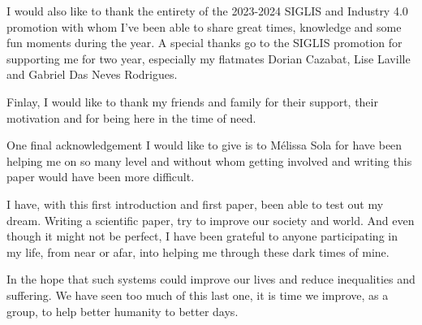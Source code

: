\documentclass[conference]{IEEEtran}
\begin{document}
I would also like to thank the entirety of the 2023-2024 SIGLIS and Industry 4.0 promotion with whom I've been able to share great times, knowledge and some fun moments during the year. A special thanks go to the SIGLIS promotion for supporting me for two year, especially my flatmates Dorian Cazabat, Lise Laville and Gabriel Das Neves Rodrigues. 

Finlay, I would like to thank my friends and family for their support, their motivation and for being here in the time of need.

One final acknowledgement I would like to give is to Mélissa Sola for have been helping me on so many level and without whom getting involved and writing this paper would have been more difficult.

\vspace{12pt}
I have, with this first introduction and first paper, been able to test out my dream. Writing a scientific paper, try to improve our society and world. And even though it might not be perfect, I have been grateful to anyone participating in my life, from near or afar, into helping me through these dark times of mine.

In the hope that such systems could improve our lives and reduce inequalities and suffering. We have seen too much of this last one, it is time we improve, as a group, to help better humanity to better days.
\vspace{12pt}



\printglossary
\end{document}
